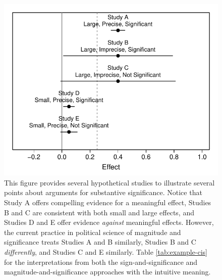 \documentclass[12pt]{article}
\begin{document}
\begin{figure}[h]
\begin{center}
\includegraphics[scale = .8]{figs/example-cis.pdf}
\caption{This figure provides several hypothetical studies to illustrate several points about arguments for substantive significance. Notice that Study A offers compelling evidence for a meaningful effect, Studies B and C are consistent with both small and large effects, and Studies D and E offer evidence \emph{against} meaningful effects. However, the current practice in political science of magnitude and significance treats Studies A and B similarly, Studies B and C \emph{differently}, and Studies C and E similarly. Table \ref{tab:example-cis} for the interpretations from both the sign-and-significance and magnitude-and-significance approaches with the intuitive meaning.}\label{fig:example-cis}
\end{center}
\end{figure}
\end{document}
